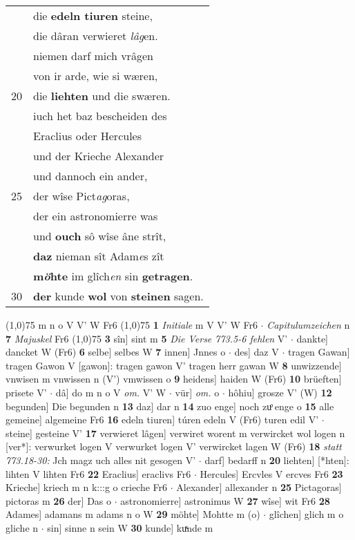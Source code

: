 \documentclass[8pt,a4paper,notitlepage]{article}
\begin{document}
\begin{table}[ht]
\begin{minipage}[t]{0.5\linewidth}
\begin{tabular}{rl}
 & die \textbf{edeln tiuren} steine,\\ 
 & die dâran verwieret \textit{lâg}en.\\ 
 & niemen darf mich vrâgen\\ 
 & von ir arde, wie si wæren,\\ 
20 & die \textbf{liehten} und die swæren.\\ 
 & iuch het baz bescheiden des\\ 
 & Eraclius oder Hercules\\ 
 & und der Krieche Alexander\\ 
 & und dannoch ein ander,\\ 
25 & der wîse Pict\textit{ag}oras,\\ 
 & der ein astronomierre was\\ 
 & und \textbf{ouch} sô wîse âne strît,\\ 
 & \textbf{daz} nieman sît Adam\textit{e}s zît\\ 
 & \textbf{m\textit{ö}hte} im glîch\textit{en} sin \textbf{getragen}.\\ 
30 & \textbf{der} kunde \textbf{wol} von \textbf{steinen} sagen.\\ 
\end{tabular}
\scriptsize
\line(1,0){75} \newline
m n o V V' W Fr6 \newline
\line(1,0){75} \newline
\textbf{1} \textit{Initiale} m V V' W Fr6   $\cdot$ \textit{Capitulumzeichen} n  \textbf{7} \textit{Majuskel} Fr6  \newline
\line(1,0){75} \newline
\textbf{3} sîn] sint m \textbf{5} \textit{Die Verse 773.5-6 fehlen} V'   $\cdot$ dankte] dancket W (Fr6) \textbf{6} selbe] selbes W \textbf{7} innen] Jnnes o  $\cdot$ des] daz V  $\cdot$ tragen Gawan] tragen Gawon V [gawon]: tragen gawon V' tragen herr gawan W \textbf{8} unwizzende] vnwisen m vnwissen n (V') vmwissen o \textbf{9} heidens] haiden W (Fr6) \textbf{10} brüeften] prisete V'  $\cdot$ dâ] do m n o V \textit{om.} V' W  $\cdot$ vür] \textit{om.} o  $\cdot$ hôhiu] grosze V' (W) \textbf{12} begunden] Die begunden n \textbf{13} daz] dar n \textbf{14} zuo enge] noch zuͦ enge o \textbf{15} alle gemeine] algemeine Fr6 \textbf{16} edeln tiuren] túren edeln V (Fr6) turen edil V'  $\cdot$ steine] gesteine V' \textbf{17} verwieret lâgen] verwiret worent m verwircket wol logen n [ver*]: verwurket logen V verwurket logen V' verwircket lagen W (Fr6) \textbf{18} \textit{statt 773.18-30:} Jch magz uch alles nit gesogen V'   $\cdot$ darf] bedarff n \textbf{20} liehten] [*hten]: lihten V lihten Fr6 \textbf{22} Eraclius] eraclivs Fr6  $\cdot$ Hercules] Ercvles V ercves Fr6 \textbf{23} Krieche] kriech m n k:::g o crieche Fr6  $\cdot$ Alexander] allexander n \textbf{25} Pictagoras] pictoras m \textbf{26} der] Das o  $\cdot$ astronomierre] astronimus W \textbf{27} wîse] wit Fr6 \textbf{28} Adames] adamans m adams n o W \textbf{29} möhte] Mohtte m (o)  $\cdot$ glîchen] glich m o gliche n  $\cdot$ sin] sinne n sein W \textbf{30} kunde] kuͯnde m \newline
\end{minipage}
\end{table}
\end{document}

